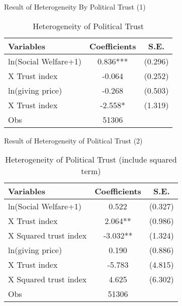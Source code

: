 \documentclass[
  ignorenonframetext,
]{beamer}
\begin{document}
\begin{frame}{Result of Heterogeneity By Political Trust (1)}
\protect\hypertarget{result-of-heterogeneity-by-political-trust-1}{}
\begin{table}

\caption{\label{tab:kableTabTrustHeteroReg}Heterogeneity of Political Trust}
\centering
\begin{tabular}[t]{lcc}
\toprule
Variables & Coefficients & S.E.\\
\midrule
ln(Social Welfare+1) & 0.836*** & (0.296)\\
\hspace{1em}X Trust index & -0.064 & (0.252)\\
ln(giving price) & -0.268 & (0.503)\\
\hspace{1em}X Trust index & -2.558* & (1.319)\\
Obs & 51306 & \\
\bottomrule
\end{tabular}
\end{table}
\end{frame}

\begin{frame}{Result of Heterogeneity of Political Trust (2)}
\protect\hypertarget{result-of-heterogeneity-of-political-trust-2}{}
\begin{table}

\caption{\label{tab:kableTabTrustHetero2Reg}Heterogeneity of Political Trust (include squared term)}
\centering
\begin{tabular}[t]{lcc}
\toprule
Variables & Coefficients & S.E.\\
\midrule
ln(Social Welfare+1) & 0.522 & (0.327)\\
\hspace{1em}X Trust index & 2.064** & (0.986)\\
\hspace{1em}X Squared trust index & -3.032** & (1.324)\\
ln(giving price) & 0.190 & (0.886)\\
\hspace{1em}X Trust index & -5.783 & (4.815)\\
\hspace{1em}X Squared trust index & 4.625 & (6.302)\\
Obs & 51306 & \\
\bottomrule
\end{tabular}
\end{table}
\end{frame}
\end{document}
